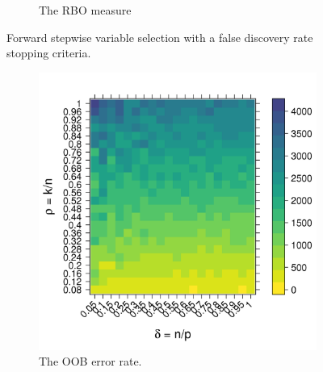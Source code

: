 \documentclass[10pt,letterpaper]{article}
\begin{document}
\begin{figure}[tbhp]
\begin{subfigure}[t]{0.5\linewidth}
       \caption{The RBO measure}
       \label{figure:rbo_Stodden_FDR.png}
     \end{subfigure} 
     \caption{Forward stepwise variable selection with a false discovery rate stopping criteria.}
       \label{figure:error_and_rbo_Stodden_FDR.png}
 \end{figure}

 \begin{figure}[tbhp] 
     \begin{subfigure}[t]{0.5\linewidth}
       \centering
       \includegraphics[totalheight=6cm]{./figs/ranger_error_Stodden_simulation.png}
       \caption{The OOB error rate.}
       \label{figure:ranger_error_Stodden_simulation.png}
       \vspace{4ex}
     \end{subfigure} 
     \begin{subfigure}[t]{0.5\linewidth}
       \centering

\end{subfigure}
\end{figure}
\end{document}
